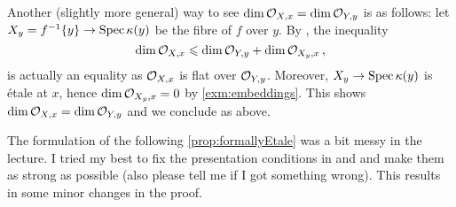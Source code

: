 \begin{rem*}
	Another (slightly more general) way to see $\dim \mathcal{O}_{X,x}=\dim\mathcal{O}_{Y,y}$ is as follows: let $X_y=f^{-1}\{y\}\morphism\Spec \kappa(y)$ be the fibre of $f$ over $y$. By \cite[]{stacks-project}, the inequality
	\begin{equation*}
		\dim\mathcal{O}_{X,x}\leqslant\dim\mathcal{O}_{Y,y}+\dim\mathcal{O}_{X_y,x}\,,
	\end{equation*}
	is actually an equality as $\mathcal{O}_{X,x}$ is flat over $\mathcal{O}_{Y,y}$. Moreover, $X_y\morphism \Spec \kappa(y)$ is étale at $x$, hence $\dim \mathcal{O}_{X_y,x}=0$ by \cref{exm:embeddings}. This shows $\dim \mathcal{O}_{X,x}=\dim\mathcal{O}_{Y,y}$ and we conclude as above.
\end{rem*}
The formulation of the following \cref{prop:formallyEtale} was a bit messy in the lecture. I tried my best to fix the presentation conditions in  and  and make them as strong as possible (also please tell me if I got something wrong). This results in some minor changes in the proof.
